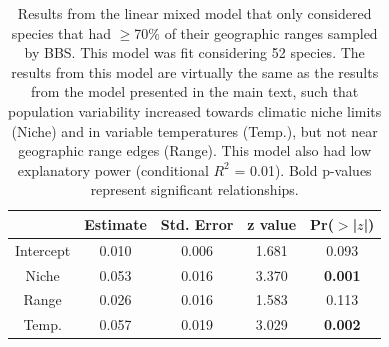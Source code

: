 \begin{table}[ht]
\centering
\caption[Range mixed effect model results]{Results from the linear mixed model that only considered species that had $\geq$70\% of their geographic ranges sampled by BBS. This model was fit considering 52 species. The results from this model are virtually the same as the results from the model presented in the main text, such that population variability increased towards climatic niche limits (Niche) and in variable temperatures (Temp.), but not near geographic range edges (Range). This model also had low explanatory power (conditional $R^2$ = 0.01). Bold p-values represent significant relationships.} 
\vspace*{3mm}
\begin{tabular}{ccccc}
  \hline
 & Estimate & Std. Error & z value & Pr($>$|$z$|) \\ 
  \hline
  Intercept & 0.010 & 0.006 & 1.681 & 0.093 \\ 
  Niche & 0.053 & 0.016 & 3.370 & \textbf{0.001} \\ 
  Range & 0.026 & 0.016 & 1.583 & 0.113 \\ 
  Temp. & 0.057 & 0.019 & 3.029 & \textbf{0.002} \\ 
   \hline
\end{tabular}
\label{tab:lmm_comp}
\end{table}
